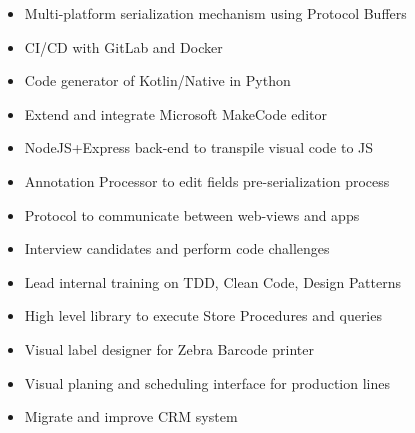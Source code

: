 \documentclass[10pt,a4paper,ragged2d,withhyper]{altacv}
\begin{document}
\begin{paracol}{2}

\begin{itemize}
\item Multi-platform serialization mechanism using Protocol Buffers
\item CI/CD with GitLab and Docker
\item Code generator of Kotlin/Native in Python
\item Extend and integrate Microsoft MakeCode editor
\item NodeJS+Express back-end to transpile visual code to JS
\item Annotation Processor to edit fields pre-serialization process
\item Protocol to communicate between web-views and apps
\item Interview candidates and perform code challenges
\item Lead internal training on TDD, Clean Code, Design Patterns
\end{itemize}


\divider

\begin{itemize}
\item High level library to execute Store Procedures and queries
\item Visual label designer for Zebra Barcode printer
\item Visual planing and scheduling interface for production lines
\item Migrate and improve CRM system
\end{itemize}

\\



\end{paracol}
\end{document}
